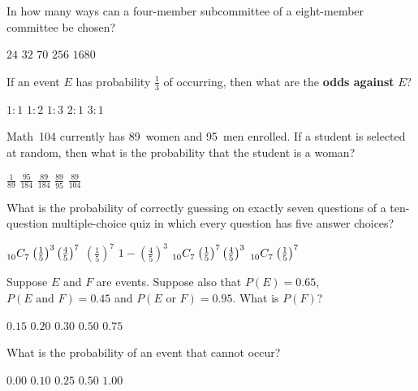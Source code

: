 \documentclass[answers,12pt]{exam}
\newcommand\ncr[2]{\tensor[_{#1}]C{_{#2}}}
\begin{document}
\begin{questions}
\question In how many ways can a four-member subcommittee
of a eight-member committee be chosen?\\
\begin{oneparchoices}
\choice $24$ %
\choice $32$ %
\correctchoice $70$
\choice $256$ %
\choice $1680$ %
\end{oneparchoices}

\question If an event $E$ has probability $\frac{1}{3}$
of occurring, then what are the {\bf odds against} $E$?\\
\begin{oneparchoices}
\choice $1:1$
\choice $1:2$
\choice $1:3$
\correctchoice $2:1$
\choice $3:1$
\end{oneparchoices}
\newpage

\question Math~104 currently has 89~women and 95~men enrolled.
If a student is selected at random, then what is the probability
that the student is a woman?\\
\begin{oneparchoices}
\choice $\frac{1}{89}$
\choice $\frac{95}{184}$
\correctchoice$\frac{89}{184}$
\choice $\frac{89}{95}$
\choice $\frac{89}{104}$
\end{oneparchoices}

\question What is the probability of correctly guessing
on exactly seven questions of a ten-question multiple-choice quiz
in which every question has five answer choices?\\
\begin{oneparchoices}
\choice $\textstyle\ncr{10}{7}\left(\frac{1}{5}\right)^3
\left(\frac{4}{5}\right)^7$
\choice $\textstyle\left(\frac{1}{5}\right)^7$
\choice $\textstyle 1-\left(\frac{4}{5}\right)^3$
\correctchoice $\textstyle\ncr{10}{7}\left(\frac{1}{5}\right)^7
\left(\frac{4}{5}\right)^3$
\choice $\textstyle\ncr{10}{7}\left(\frac{1}{5}\right)^7$
\end{oneparchoices}

\question Suppose $E$ and $F$ are events.
Suppose also that $P\left(E\right)=0.65$,
$P\left(\text{$E$ and $F$}\right)=0.45$
and $P\left(\text{$E$ or $F$}\right)=0.95$. What
is $P\left(F\right)$?\\
\begin{oneparchoices}
\choice $0.15$ %
\choice $0.20$ %
\choice $0.30$ %
\choice $0.50$ %
\correctchoice $0.75$
\end{oneparchoices}

\question What is the probability
of an event that cannot occur?\\
\begin{oneparchoices}
\correctchoice $0.00$
\choice $0.10$
\choice $0.25$
\choice $0.50$
\choice $1.00$
\end{oneparchoices}


\end{questions}
\end{document}
